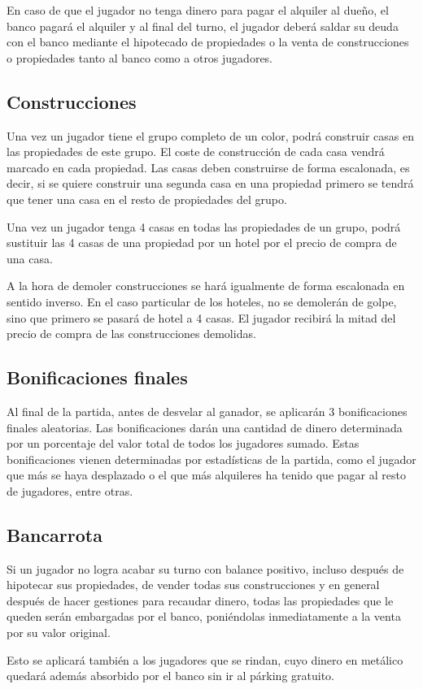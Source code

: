 En caso de que el jugador no tenga dinero para pagar el alquiler al dueño,
el banco pagará el alquiler y al final del turno, el jugador deberá saldar 
su deuda con el banco mediante el hipotecado de propiedades o la venta de
construcciones o propiedades tanto al banco como a otros jugadores.

\subsection{Construcciones}
Una vez un jugador tiene el grupo completo de un color, podrá construir
casas en las propiedades de este grupo. El coste de construcción de cada 
casa vendrá marcado en cada propiedad. Las casas deben construirse de forma 
escalonada, es decir, si se quiere construir una segunda casa en una propiedad 
primero se tendrá que tener una casa en el resto de propiedades del grupo.

Una vez un jugador tenga 4 casas en todas las propiedades de un grupo, podrá
sustituir las 4 casas de una propiedad por un hotel por el precio de compra
de una casa.

A la hora de demoler construcciones se hará igualmente de forma escalonada en 
sentido inverso. En el caso particular de los hoteles, no se demolerán de golpe,
sino que primero se pasará de hotel a 4 casas.
El jugador recibirá la mitad del precio de compra de las construcciones demolidas.


\subsection{Bonificaciones finales}
Al final de la partida, antes de desvelar al ganador, se aplicarán 3
bonificaciones finales aleatorias. Las bonificaciones darán una cantidad
de dinero determinada por un porcentaje del valor total de todos los jugadores 
sumado.
Estas bonificaciones vienen determinadas por estadísticas de la partida,
como el jugador que más se haya desplazado o el que más alquileres ha 
tenido que pagar al resto de jugadores, entre otras.

\subsection{Bancarrota}
Si un jugador no logra acabar su turno con balance positivo,
incluso después de hipotecar sus propiedades,
de vender todas sus construcciones y en general después de hacer 
gestiones para recaudar dinero,
todas las propiedades que le queden serán embargadas por el banco,
poniéndolas inmediatamente a la venta por su valor original.

Esto se aplicará también a los jugadores que se rindan, cuyo dinero en 
metálico quedará además absorbido por el banco sin ir al párking gratuito.


